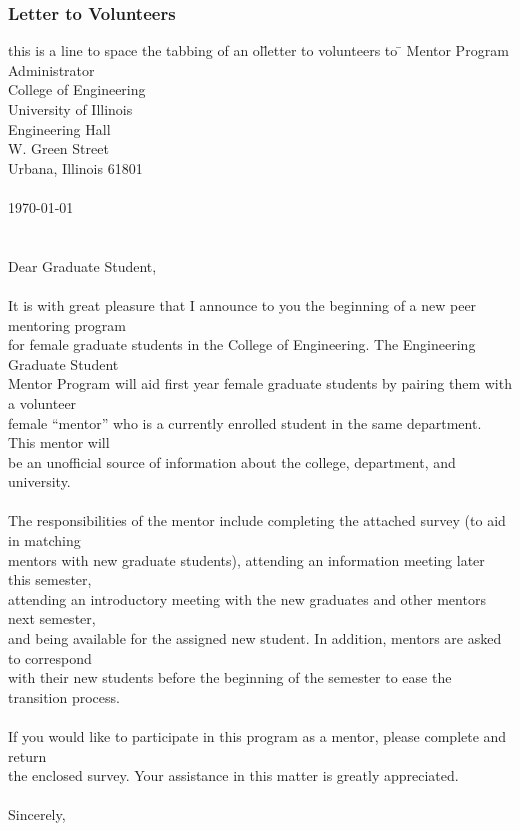 \subsubsection{Letter to Volunteers}
\label{volletter}
\begin{tabbing}
this is a line to space the tabbing of an ol\= letter to volunteers to \= \kill
\>\>Mentor Program Administrator  \\
\>\>College of Engineering\\
\>\>University of Illinois\\
\> Engineering Hall \\
\> W. Green Street \\
\>\>Urbana, Illinois  61801\\
\\
\>\>\today  \\
\\
\\
Dear Graduate Student, \\
\\
It is with great pleasure that I announce to you the beginning of a new peer mentoring program \\
for female graduate students in the College of Engineering.  The Engineering Graduate Student \\
Mentor Program will aid first year female graduate students by pairing them with a volunteer\\
female ``mentor''  who is a currently enrolled student in the same department.   This mentor will \\
be an unofficial source of information about the college, department, and university. \\
 \\
The responsibilities of the mentor include completing the attached survey (to aid in matching \\
mentors with new graduate students), attending an information meeting later this semester, \\
attending an introductory meeting with the new graduates and other mentors next semester, \\
and being available for the assigned new student.  In addition, mentors are asked to correspond \\
with their new students before the beginning of the semester to ease the transition process.\\
 \\
If you would like to participate in this program as a mentor, please complete and return \\
the enclosed survey.  Your assistance in this matter is greatly appreciated. \\
 \\
\> Sincerely,\\
\\
\\
\end{tabbing}

